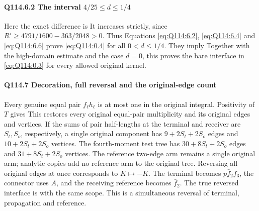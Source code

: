 \paragraph{Q114.6.2 The interval $4/25\le\allowbreak  d\le\allowbreak 1/4$}\label{part:Q114.6.2}
Here the exact difference is
It increases strictly, since $R'\ge\allowbreak 4791/1600-363/2048>\allowbreak 0$. Thus
Equations \eqref{eq:Q114:6.2}, \eqref{eq:Q114:6.4} and
\eqref{eq:Q114:6.6} prove \eqref{eq:Q114:0.4} for all $0<\allowbreak d\le\allowbreak 1/4$.
They imply
Together with the high-domain estimate and the case $d=\allowbreak 0$, this proves
the bare interface in \eqref{eq:Q114:0.3} for every allowed original kernel.

\paragraph{Q114.7 Decoration, full reversal and the original-edge count}\label{part:Q114.7}
Every genuine equal pair $f_\ell h_\ell$ is at most one in the original
integral. Positivity of $T$ gives
This restores every original equal-pair multiplicity and its original
edges and vertices. If the sums of pair half-lengths at the terminal and
receiver are $S_t,\allowbreak S_o$, respectively, a single original component has
$9+2S_t+2S_o$ edges and $10+2S_t+2S_o$ vertices.
The fourth-moment test tree has $30+8S_t+2S_o$ edges and
$31+8S_t+2S_o$ vertices. The reference two-edge arm remains a single
original arm; analytic copies add no reference arm to the original tree.
Reversing all original edges at once corresponds to $K\mapsto-K$.
The terminal becomes $p\bar f_2f_3$, the connector uses $A$, and the
receiving reference becomes $\bar f_2$. The true reversed interface is
with the same scope. This is a simultaneous reversal of terminal,
propagation and reference.

